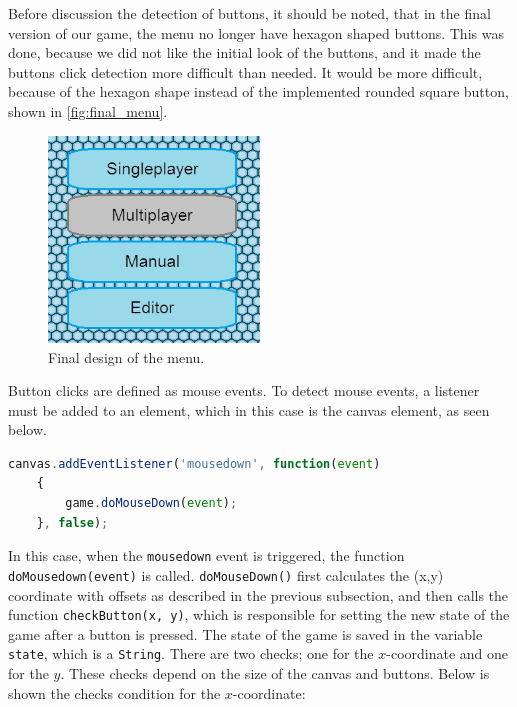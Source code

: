 Before discussion the detection of buttons, it should be noted, that in the final version of our game, the menu no longer have hexagon shaped buttons. This was done, because we did not like the initial look of the buttons, and it made the buttons click detection more difficult than needed. It would be more difficult, because of the hexagon shape instead of the implemented rounded square button, shown in \autoref{fig:final_menu}.

\begin{figure}[h]
	\centering
	\includegraphics[width=0.5\textwidth]{img/final_menu.png}
	\caption{Final design of the menu.}
	\label{fig:final_menu}
\end{figure}

Button clicks are defined as mouse events. To detect mouse events, a listener must be added to an element, which in this case is the canvas element, as seen below.

\begin{lstlisting}[language=JavaScript, caption=Add event listener to canvas]
canvas.addEventListener('mousedown', function(event)
	{
		game.doMouseDown(event);
	}, false);
\end{lstlisting}

In this case, when the \verb|mousedown| event is triggered, the function\\
\verb|doMousedown(event)| is called. \verb|doMouseDown()| first calculates the (x,y) coordinate with offsets as described in the previous subsection, and then calls the function \verb|checkButton(x, y)|, which is responsible for setting the new state of the game after a button is pressed. The state of the game is saved in the variable \verb|state|, which is a \verb|String|. There are two checks; one for the $x$-coordinate and one for the $y$. These checks depend on the size of the canvas and buttons. Below is shown the checks condition for the $x$-coordinate:

